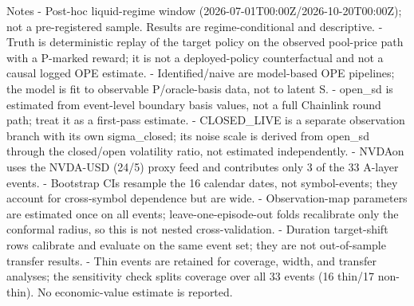 \begin{table}[!ht]
\par\noindent\begin{minipage}{\linewidth}\raggedright{\scriptsize Notes - Post-hoc liquid-regime window (2026-07-01T00:00Z/2026-10-20T00:00Z); not a pre-registered sample. Results are regime-conditional and descriptive. - Truth is deterministic replay of the target policy on the observed pool-price path with a P-marked reward; it is not a deployed-policy counterfactual and not a causal logged OPE estimate. - Identified/naive are model-based OPE pipelines; the model is fit to observable P/oracle-basis data, not to latent S. - open\_sd is estimated from event-level boundary basis values, not a full Chainlink round path; treat it as a first-pass estimate. - CLOSED\_LIVE is a separate observation branch with its own sigma\_closed; its noise scale is derived from open\_sd through the closed/open volatility ratio, not estimated independently. - NVDAon uses the NVDA-USD (24/5) proxy feed and contributes only 3 of the 33 A-layer events. - Bootstrap CIs resample the 16 calendar dates, not symbol-events; they account for cross-symbol dependence but are wide. - Observation-map parameters are estimated once on all events; leave-one-episode-out folds recalibrate only the conformal radius, so this is not nested cross-validation. - Duration target-shift rows calibrate and evaluate on the same event set; they are not out-of-sample transfer results. - Thin events are retained for coverage, width, and transfer analyses; the sensitivity check splits coverage over all 33 events (16 thin/17 non-thin). No economic-value estimate is reported.}\end{minipage}\par

\end{table}
